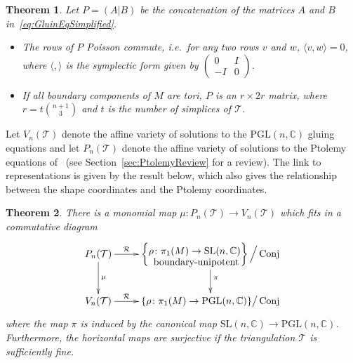 \documentclass[12pt]{amsart}
\newtheorem{theorem}{Theorem}[section]
\theoremstyle{definition}
\numberwithin{equation}{section}
\def\cxymatrix#1{\xy*[c]\xybox{\xymatrix#1}\endxy}
\def\BC{\mathbb C}
\def\SL{\mathrm{SL}}
\def\PGL{\mathrm{PGL}}
\DeclareMathOperator{\Conj}{Conj}
\def\CT{\mathcal T}
\def\C{\mathbb{C}}
\def\T{\mathcal{T}}
\begin{document}
\begin{theorem}\label{thm:soft} Let $P=(A\vert B)$ be the concatenation of the matrices $A$ and $B$ in~\eqref{eq:GluinEqSimplified}.

\begin{itemize}
\item[(a)]\label{item:Soft1} The rows of $P$ Poisson commute, i.e.~for any two rows $v$ and $w$, $\langle v,w\rangle=0$, where $\langle,\rangle$ is the symplectic form given by $\left(\begin{smallmatrix}0&I\\-I&0\end{smallmatrix}\right)$.
\item[(b)]\label{item:soft2} If all boundary components of $M$ are tori, $P$ is an $r\times 2r$ matrix, where $r=t\binom{n+1}{3}$ and $t$ is the number of simplices of $\T$.
\end{itemize}
\end{theorem}

Let $V_n(\CT)$ denote the affine variety of solutions to the 
$\PGL(n,\BC)$ gluing equations and let $P_n(\CT)$ denote the affine variety
of solutions to the Ptolemy equations of~\cite{GaroufalidisThurstonZickert} (see Section~\ref{sec:PtolemyReview} for a review).
The link to representations is given by the result below, which also gives the relationship between the shape coordinates and the Ptolemy coordinates.

\begin{theorem}\label{thm:ShortMainThm} There is a monomial map $\mu\colon P_n(\T)\to V_n(\T)$ which fits in a commutative diagram
\begin{equation}\label{eqn:ShortDiagramIntro}
\cxymatrix{{{P_n(\T)}\ar[r]^-{\mathcal R}\ar[d]^\mu&{\left\{\txt{$\rho\colon\pi_1(M)\to\SL(n,\C)$\\\textnormal{ boundary-unipotent}}\right\}\Big/\Conj}\ar[d]^\pi\\{V_n(\T)}\ar[r]^-{\mathcal R}&{\{\rho\colon\pi_1(M)\to\PGL(n,\C)\}\big/\Conj}}}
\end{equation}
where the map $\pi$ is induced by the canonical map $\SL(n,\C)\to\PGL(n,\C)$. Furthermore, the horizontal maps are surjective if the triangulation $\T$ is sufficiently fine.
\end{theorem}

\end{document}
